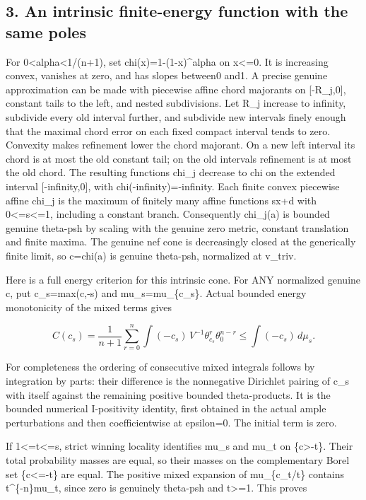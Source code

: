 \documentclass[
  10pt,
]{article}
\begin{document}
\subsection{3. An intrinsic finite-energy function with the same
poles}\label{an-intrinsic-finite-energy-function-with-the-same-poles}

For 0\textless alpha\textless1/(n+1), set chi(x)=1-(1-x)\^{}alpha on
x\textless=0. It is increasing convex, vanishes at zero, and has slopes
between0 and1. A precise genuine approximation can be made with
piecewise affine chord majorants on {[}-R\_j,0{]}, constant tails to the
left, and nested subdivisions. Let R\_j increase to infinity, subdivide
every old interval further, and subdivide new intervals finely enough
that the maximal chord error on each fixed compact interval tends to
zero. Convexity makes refinement lower the chord majorant. On a new left
interval its chord is at most the old constant tail; on the old
intervals refinement is at most the old chord. The resulting functions
chi\_j decrease to chi on the extended interval {[}-infinity,0{]}, with
chi(-infinity)=-infinity. Each finite convex piecewise affine chi\_j is
the maximum of finitely many affine functions sx+d with
0\textless=s\textless=1, including a constant branch. Consequently
chi\_j(a) is bounded genuine theta-psh by scaling with the genuine zero
metric, constant translation and finite maxima. The genuine nef cone is
decreasingly closed at the generically finite limit, so c=chi(a) is
genuine theta-psh, normalized at v\_triv.

Here is a full energy criterion for this intrinsic cone. For ANY
normalized genuine c, put c\_s=max(c,-s) and mu\_s=mu\_\{c\_s\}. Actual
bounded energy monotonicity of the mixed terms gives

\[C(c_s)=\frac1{n+1}\sum_{r=0}^{n}\int(-c_s)\,V^{-1}\theta_{c_s}^r\theta_0^{n-r}
\leq\int(-c_s)\,d\mu_s.\]

For completeness the ordering of consecutive mixed integrals follows by
integration by parts: their difference is the nonnegative Dirichlet
pairing of c\_s with itself against the remaining positive bounded
theta-products. It is the bounded numerical I-positivity identity, first
obtained in the actual ample perturbations and then coefficientwise at
epsilon=0. The initial term is zero.

If 1\textless=t\textless=s, strict winning locality identifies mu\_s and
mu\_t on \{c\textgreater-t\}. Their total probability masses are equal,
so their masses on the complementary Borel set \{c\textless=-t\} are
equal. The positive mixed expansion of mu\_\{c\_t/t\} contains
t\^{}\{-n\}mu\_t, since zero is genuinely theta-psh and t\textgreater=1.
This proves
\end{document}
